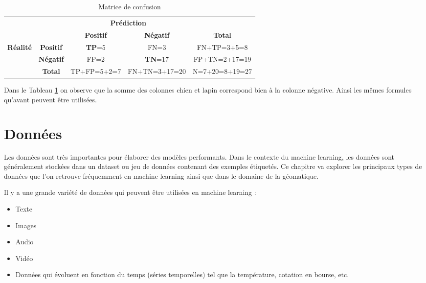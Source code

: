 \begin{table}[H]
    \centering
    \begin{tabular}{|c|c|c|c|c|}
    \cline{3-4}
    \multicolumn{1}{c}{} & \multicolumn{1}{c|}{} & \multicolumn{2}{c|}{\textbf{Prédiction}} & \multicolumn{1}{c}{} \\
    \cline{3-5}
    \multicolumn{1}{c}{} & \multicolumn{1}{c|}{} & \textbf{Positif} & \textbf{Négatif} & \textbf{Total} \\
    \hline
    \multirow{2}{*}{\textbf{Réalité}} & \textbf{Positif} & \textbf{TP}=5 & FN=3 & FN+TP=3+5=8 \\
    \cline{2-5}
    & \textbf{Négatif} & FP=2 & \textbf{TN}=17 & FP+TN=2+17=19 \\
    \hline
    \multicolumn{1}{c|}{} & \textbf{Total} & TP+FP=5+2=7 & FN+TN=3+17=20 & N=7+20=8+19=27 \\
    \cline{2-5}
    \end{tabular}
    \caption{Matrice de confusion}
    \label{tab:matrice_confusion_multiclasse_reduction}
\end{table}

Dans le Tableau \ref{tab:matrice_confusion_multiclasse_reduction} on observe que la somme des colonnes chien et lapin correspond bien à la colonne négative. Ainsi les mêmes formules qu'avant peuvent être utilisées.

\newpage
\section{Données}

Les données sont très importantes pour élaborer des modèles performants. Dans le contexte du machine learning, les données sont généralement stockées dans un dataset ou jeu de données contenant des exemples étiquetés. Ce chapitre va explorer les principaux types de données que l'on retrouve fréquemment en machine learning ainsi que dans le domaine de la géomatique.

Il y a une grande variété de données qui peuvent être utilisées en machine learning :
\begin{itemize}
    \item Texte
    \item Images
    \item Audio
    \item Vidéo
    \item Données qui évoluent en fonction du temps (séries temporelles) tel que la température, cotation en bourse, etc.
\end{itemize}

